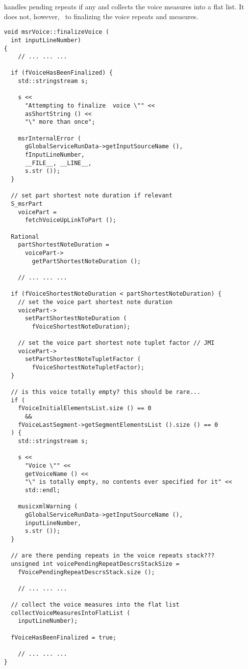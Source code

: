  handles pending repeats if any and collects the voice measures into a flat list. It does not, however, \cascade\ to finalizing the voice repeats and measures.
\begin{lstlisting}[language=CPlusPlus]
void msrVoice::finalizeVoice (
  int inputLineNumber)
{
	// ... ... ...

  if (fVoiceHasBeenFinalized) {
    std::stringstream s;

    s <<
      "Attempting to finalize  voice \"" <<
      asShortString () <<
      "\" more than once";

    msrInternalError (
      gGlobalServiceRunData->getInputSourceName (),
      fInputLineNumber,
      __FILE__, __LINE__,
      s.str ());
  }

  // set part shortest note duration if relevant
  S_msrPart
    voicePart =
      fetchVoiceUpLinkToPart ();

  Rational
    partShortestNoteDuration =
      voicePart->
        getPartShortestNoteDuration ();

	// ... ... ...

  if (fVoiceShortestNoteDuration < partShortestNoteDuration) {
    // set the voice part shortest note duration
    voicePart->
      setPartShortestNoteDuration (
        fVoiceShortestNoteDuration);

    // set the voice part shortest note tuplet factor // JMI
    voicePart->
      setPartShortestNoteTupletFactor (
        fVoiceShortestNoteTupletFactor);
  }

  // is this voice totally empty? this should be rare...
  if (
    fVoiceInitialElementsList.size () == 0
      &&
    fVoiceLastSegment->getSegmentElementsList ().size () == 0
  ) {
    std::stringstream s;

    s <<
      "Voice \"" <<
      getVoiceName () <<
      "\" is totally empty, no contents ever specified for it" <<
      std::endl;

    musicxmlWarning (
      gGlobalServiceRunData->getInputSourceName (),
      inputLineNumber,
      s.str ());
  }

  // are there pending repeats in the voice repeats stack???
  unsigned int voicePendingRepeatDescrsStackSize =
    fVoicePendingRepeatDescrsStack.size ();

	// ... ... ...

  // collect the voice measures into the flat list
  collectVoiceMeasuresIntoFlatList (
    inputLineNumber);

  fVoiceHasBeenFinalized = true;

	// ... ... ...
}
\end{lstlisting}


